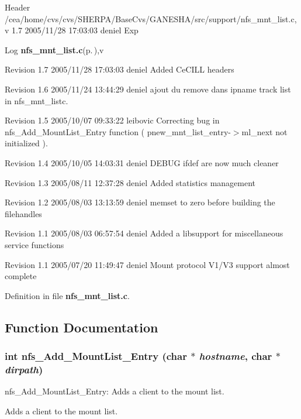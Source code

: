 \begin{Desc}
\item[Header]/cea/home/cvs/cvs/SHERPA/Base\-Cvs/GANESHA/src/support/nfs\_\-mnt\_\-list.c,v 1.7 2005/11/28 17:03:03 deniel Exp \end{Desc}


\begin{Desc}
\item[Log]{\bf nfs\_\-mnt\_\-list.c}{\rm (p.\,\pageref{nfs__mnt__list_8c})},v \end{Desc}
Revision 1.7 2005/11/28 17:03:03 deniel Added Ce\-CILL headers

Revision 1.6 2005/11/24 13:44:29 deniel ajout du remove dans ipname track list in nfs\_\-mnt\_\-listc.

Revision 1.5 2005/10/07 09:33:22 leibovic Correcting bug in nfs\_\-Add\_\-Mount\-List\_\-Entry function ( pnew\_\-mnt\_\-list\_\-entry-$>$ml\_\-next not initialized ).

Revision 1.4 2005/10/05 14:03:31 deniel DEBUG ifdef are now much cleaner

Revision 1.3 2005/08/11 12:37:28 deniel Added statistics management

Revision 1.2 2005/08/03 13:13:59 deniel memset to zero before building the filehandles

Revision 1.1 2005/08/03 06:57:54 deniel Added a libsupport for miscellaneous service functions

Revision 1.1 2005/07/20 11:49:47 deniel Mount protocol V1/V3 support almost complete

Definition in file {\bf nfs\_\-mnt\_\-list.c}.

\subsection{Function Documentation}
\subsubsection{\setlength{\rightskip}{0pt plus 5cm}int nfs\_\-Add\_\-Mount\-List\_\-Entry (char $\ast$ {\em hostname}, char $\ast$ {\em dirpath})}\label{nfs__mnt__list_8c_a2}


nfs\_\-Add\_\-Mount\-List\_\-Entry: Adds a client to the mount list.

Adds a client to the mount list.

